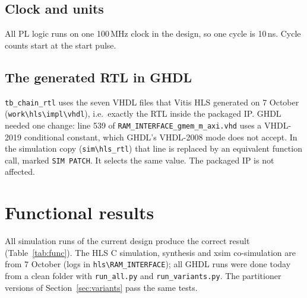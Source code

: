 \documentclass[11pt,a4paper]{article}
\newcommand{\code}[1]{\texttt{#1}}
\begin{document}
\subsection{Clock and units}
All PL logic runs on one 100\,MHz clock in the design, so one cycle is 10\,ns. Cycle counts start at the start pulse.

\subsection{The generated RTL in GHDL}
\code{tb\_chain\_rtl} uses the seven VHDL files that Vitis HLS generated on 7 October (\code{work\textbackslash hls\textbackslash impl\textbackslash vhdl}), i.e.\ exactly the RTL inside the packaged IP. GHDL needed one change: line 539 of \code{RAM\_INTERFACE\_gmem\_m\_axi.vhd} uses a VHDL-2019 conditional constant, which GHDL's VHDL-2008 mode does not accept. In the simulation copy (\code{sim\textbackslash hls\_rtl}) that line is replaced by an equivalent function call, marked \code{SIM PATCH}. It selects the same value. The packaged IP is not affected.

\section{Functional results}
All simulation runs of the current design produce the correct result (Table~\ref{tab:func}). The HLS C simulation, synthesis and xsim co-simulation are from 7 October (logs in \code{hls\textbackslash RAM\_INTERFACE}); all GHDL runs were done today from a clean folder with \code{run\_all.py} and \code{run\_variants.py}. The partitioner versions of Section~\ref{sec:variants} pass the same tests.
\end{document}
